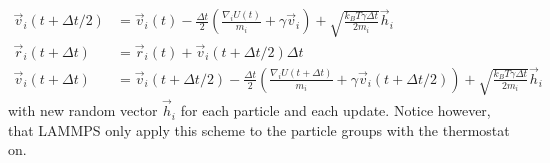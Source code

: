 \begin{align*}
  \vec{v}_i(t + \Delta t/2)  &= \vec{v}_i(t) - \frac{\Delta t}{2}\left(\frac{\nabla_i U(t)}{m_i} + \gamma \vec{v}_i \right) + \sqrt{\frac{k_B T \gamma \Delta t}{2m_i}} \vec{h}_i \\ 
  \vec{r}_i(t + \Delta t) &= \vec{r}_i(t) + \vec{v}_i(t + \Delta t/2) \Delta t \\
  \vec{v}_i(t + \Delta t) &= \vec{v}_i(t+ \Delta t/2) - \frac{\Delta t}{2}\left(\frac{\nabla_i U(t + \Delta t)}{m_i} + \gamma \vec{v}_i(t + \Delta t/2) \right) + \sqrt{\frac{k_B T \gamma \Delta t}{2m_i}} \vec{h}_i
\end{align*}
with new random vector $\vec{h}_i$ for each particle and each update. Notice
however, that LAMMPS only apply this scheme to the particle groups with the
thermostat on. 







